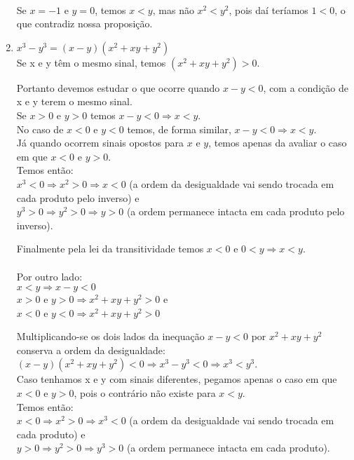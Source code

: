 \documentclass[10pt]{book}
\begin{document}
\begin{enumerate}
	\paragraph{}Se $x = -1$ e $y = 0$, temos $x < y$, mas não $x^2 < y^2$, pois daí teríamos $1 < 0$, o que contradiz nossa proposição.
	\item 
	$x^3  - y^3 = (x - y)(x^2 + xy + y^2)$\\
	Se x e y têm o mesmo sinal, temos $(x^2 + xy + y^2) > 0$.
	
	Portanto devemos estudar o que ocorre quando $x - y < 0$, com a condição de x e y terem o mesmo sinal.\\
	Se $x > 0$ e $y > 0$ temos $x - y < 0 \Rightarrow x < y$.\\
	No caso de $x < 0$ e $y < 0$ temos, de forma similar, $x - y < 0 \Rightarrow x < y$.\\
	Já quando ocorrem sinais opostos para $x$ e $y$, temos apenas da avaliar o caso em que $x < 0$ e $y > 0$.\\
	Temos então:\\
	$x^3 < 0 \Rightarrow x^2 > 0 \Rightarrow x < 0$ (a ordem da desigualdade vai sendo trocada em cada produto pelo inverso) e\\
	$y^3 > 0 \Rightarrow y^2 > 0 \Rightarrow y > 0$ (a ordem permanece intacta em cada produto pelo inverso).
	
	Finalmente pela lei da transitividade temos $x < 0$ e $0 < y \Rightarrow x < y$.
	\\\\
	Por outro lado:\\
	$x < y \Rightarrow x - y < 0$\\
	$x > 0$ e $y > 0 \Rightarrow x^2 + xy + y^2 > 0$ e\\
    $x < 0$ e $y < 0	\Rightarrow  x^2 + xy + y^2 > 0$
	
	Multiplicando-se os dois lados da inequação $x - y < 0$ por $x^2 + xy + y^2$ conserva a ordem da desigualdade:\\
	$(x - y)(x^2 + xy + y^2) < 0 \Rightarrow x^3 - y^3 < 0 \Rightarrow x^3 < y^3$.\\
	Caso tenhamos x e y com sinais diferentes, pegamos apenas o caso em que $x < 0$ e $y > 0$, pois o contrário não existe para $x < y$.\\
	Temos então:\\
	$x < 0 \Rightarrow x^2 > 0 \Rightarrow x^3 < 0$ (a ordem da desigualdade vai sendo trocada em cada produto) e\\
	$y > 0 \Rightarrow y^2 > 0 \Rightarrow y^3 > 0$ (a ordem permanece intacta em cada produto).
	

\end{enumerate}
\end{document}
